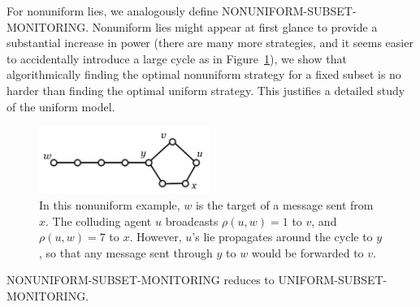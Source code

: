 \documentclass[prodmode,acmec]{ec-acmsmall}
\begin{document}
For nonuniform lies, we analogously define NONUNIFORM-SUBSET-MONITORING.
Nonuniform lies might appear at first glance to provide a substantial increase
in power (there are many more strategies, and it seems easier to accidentally
introduce a large cycle as in Figure~\ref{fig:nonuniform-cycle}), we show that
algorithmically finding the optimal nonuniform strategy for a fixed subset is
no harder than finding the optimal uniform strategy. This justifies a detailed
study of the uniform model.

\begin{figure}[b]
\centering
\includegraphics[width=0.5\textwidth]{images/5cycle.pdf}
\caption{In this nonuniform example, $w$ is the target of a message sent from $x$. The
colluding agent $u$ broadcasts $\rho(u,w) = 1$ to $v$, and $\rho(u,w) = 7$ to
$x$. However, $u$'s lie propagates around the cycle to $y$, so that any message
sent through $y$ to $w$ would be forwarded to $v$.}
\label{fig:nonuniform-cycle}
\end{figure}

\begin{proposition} \label{prop:uniform-reduction}

NONUNIFORM-SUBSET-MONITORING reduces to UNIFORM-SUBSET-MONITORING.

\end{proposition}
\end{document}
